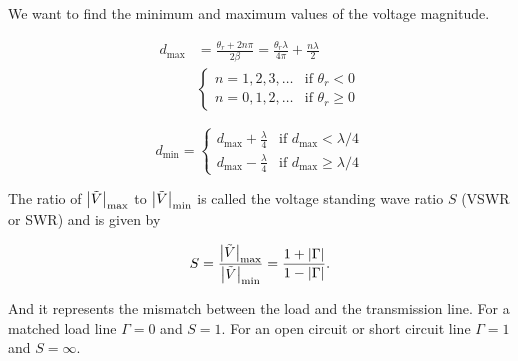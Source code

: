 \documentclass{report}
\begin{document}
We want to find the minimum and maximum values of the voltage magnitude.

\begin{align*}
	d_\text{max} & = \frac{\theta_r +2n\pi}{2\beta} = \frac{\theta_r\lambda}{4\pi} + \frac{n\lambda}{2} \\
	             & \begin{cases}
		               n=1,2,3,\ldots & \text{if } \theta_r < 0    \\
		               n=0,1,2,\ldots & \text{if } \theta_r \geq 0
	               \end{cases}
\end{align*}

\[
	d_\text{min} = \begin{cases}
		d_\text{max} + \frac{\lambda}{4} & \text{if } d_\text{max} < \lambda/4    \\
		d_\text{max} - \frac{\lambda}{4} & \text{if } d_\text{max} \geq \lambda/4
	\end{cases}
\]

The ratio of $\abs{\tilde{V}}_\text{max}$ to $\abs{\tilde{V}}_\text{min}$ is called the voltage standing wave ratio $S$ (VSWR or SWR) and is given by

\[
	S = \frac{\abs{\tilde{V}}_\text{max}}{\abs{\tilde{V}}_\text{min}} = \frac{1 + \abs{\Gamma}}{1 - \abs{\Gamma}}
	.\]

And it represents the mismatch between the load and the transmission line. For a matched load line $\Gamma=0$ and $S=1$. For an open circuit or short circuit line $\Gamma=1$ and $S=\infty$.\\

\end{document}
